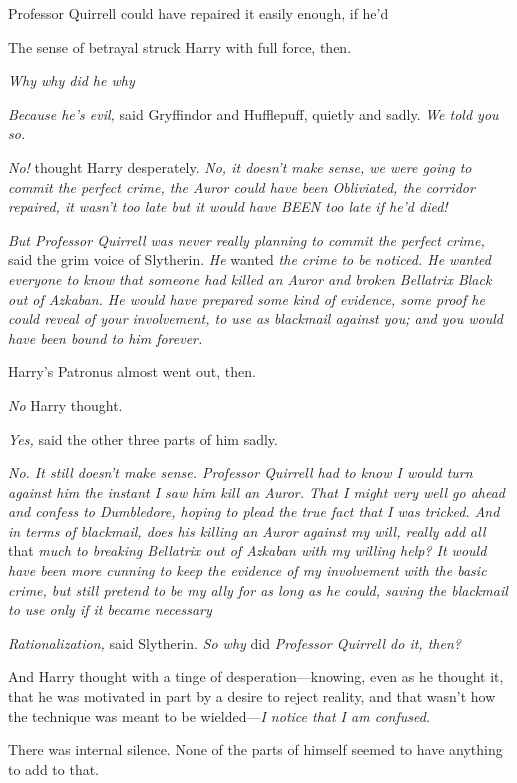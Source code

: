 Professor Quirrell could have repaired it easily enough, if he'd{\el}

The sense of betrayal struck Harry with full force, then.

\emph{Why{\el} why did he{\el} why{\el}}

\emph{Because he's evil,} said Gryffindor and Hufflepuff, quietly and sadly.
\emph{We told you so.}

\emph{No!} thought Harry desperately. \emph{No, it doesn't make sense, we were
going to commit the perfect crime, the Auror could have been Obliviated, the
corridor repaired, it wasn't too late but it would have BEEN too late if he'd
died!}

\emph{But Professor Quirrell was never really planning to commit the perfect
crime,} said the grim voice of Slytherin. \emph{He} wanted \emph{the crime to
be noticed. He wanted everyone to know that someone had killed an Auror and
broken Bellatrix Black out of Azkaban. He would have prepared some kind of
evidence, some proof he could reveal of your involvement, to use as blackmail
against you; and you would have been bound to him forever.}

Harry's Patronus almost went out, then.

\emph{No{\el}} Harry thought.

\emph{Yes,} said the other three parts of him sadly.

\emph{No. It still doesn't make sense. Professor Quirrell had to know I would
turn against him the instant I saw him kill an Auror. That I might very well go
ahead and confess to Dumbledore, hoping to plead the true fact that I was
tricked. And{\el} in terms of blackmail, does his killing an Auror against
my will, really add all} that \emph{much to breaking Bellatrix out of Azkaban
with my willing help? It would have been more cunning to keep the evidence of
my involvement with the basic crime, but still pretend to be my ally for as
long as he could, saving the blackmail to use only if it became
necessary{\el}}

\emph{Rationalization,} said Slytherin. \emph{So why} did \emph{Professor
Quirrell do it, then?}

And Harry thought with a tinge of desperation—knowing, even as he thought it,
that he was motivated in part by a desire to reject reality, and that wasn't
how the technique was meant to be wielded—\emph{I notice that I am confused.}

There was internal silence. None of the parts of himself seemed to have
anything to add to that.


